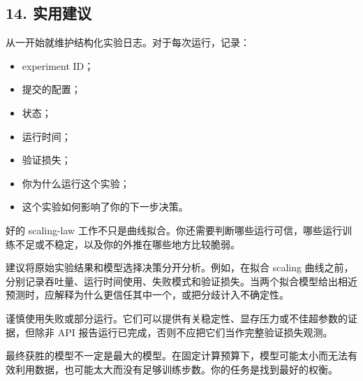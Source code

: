 \documentclass[
  11pt,
]{ctexart}
\providecommand{\tightlist}{%
  \setlength{\itemsep}{0pt}\setlength{\parskip}{0pt}}
\begin{document}
\hypertarget{ux5b9eux7528ux5efaux8bae}{%
\subsection{14. 实用建议}\label{ux5b9eux7528ux5efaux8bae}}

从一开始就维护结构化实验日志。对于每次运行，记录：

\begin{itemize}
\tightlist
\item
  experiment ID；
\item
  提交的配置；
\item
  状态；
\item
  运行时间；
\item
  验证损失；
\item
  你为什么运行这个实验；
\item
  这个实验如何影响了你的下一步决策。
\end{itemize}

好的 scaling-law
工作不只是曲线拟合。你还需要判断哪些运行可信，哪些运行训练不足或不稳定，以及你的外推在哪些地方比较脆弱。

建议将原始实验结果和模型选择决策分开分析。例如，在拟合 scaling
曲线之前，分别记录吞吐量、运行时间使用、失败模式和验证损失。当两个拟合模型给出相近预测时，应解释为什么更信任其中一个，或把分歧计入不确定性。

谨慎使用失败或部分运行。它们可以提供有关稳定性、显存压力或不佳超参数的证据，但除非
API 报告运行已完成，否则不应把它们当作完整验证损失观测。

最终获胜的模型不一定是最大的模型。在固定计算预算下，模型可能太小而无法有效利用数据，也可能太大而没有足够训练步数。你的任务是找到最好的权衡。
\end{document}
